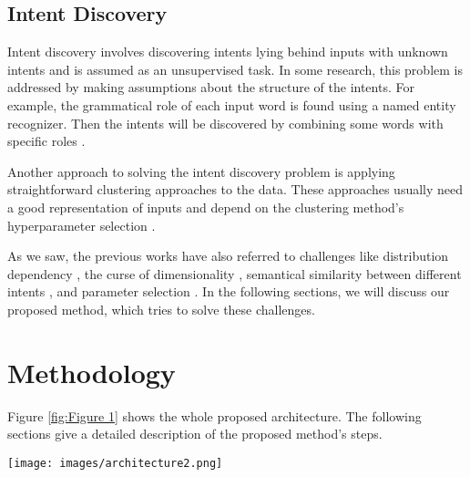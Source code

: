 \documentclass{article}
\begin{document}
\subsection{Intent Discovery}

\noindent Intent discovery involves discovering intents lying behind inputs with unknown intents and is assumed as an unsupervised task. 
In some research, this problem is addressed by making assumptions about the structure of the intents. 
For example, the grammatical role of each input word is found using a named entity recognizer. 
Then the intents will be discovered by combining some words with specific roles \citep{10.1145/3366423.3380268,zeng2021automatic}.

Another approach to solving the intent discovery problem is applying straightforward clustering approaches to the data. 
These approaches usually need a good representation of inputs and depend on the clustering method's hyperparameter selection \citep{padmasundari2018intent,zhang2021discovering}.

As we saw, the previous works have also referred to challenges like distribution dependency \citep{zhan-etal-2021-scope}, the curse of dimensionality \citep{padmasundari2018intent}, 
semantical similarity between different intents \citep{lin-xu-2019-deep}, and parameter selection \citep{zhang2021discovering}. 
In the following sections, we will discuss our proposed method, which tries to solve these challenges.

\section{Methodology}\label{methodology}

\noindent Figure \ref{fig:Figure 1} shows the whole proposed architecture.
The following sections give a detailed description of the proposed method's steps.

\begin{figure*}[ht!]
	\centering
	\texttt{[image: images/architecture2.png]}
	\caption{This figure shows the whole flow of the proposed architecture. 
			In the first step, the fine-tuned BERT encoder gets utterance  and passes its representation  to the VAE. 
			Then, the reconstruction  is generated, and the loss  between  and  is computed. 
			Suppose  is lower than a threshold . 
			In that case,  will be considered in-domain input, 
			and the related representation  is passed to the simple one-layer neural network classifier to predict its label. 
			Otherwise,  will be passed to the K-PCA dimensionality reduction component, 
			and the HDBSCAN clustering algorithm will predict the resulting vector's pseudo label (or cluster).}
	\label{fig:Figure 1}
  \end{figure*}
\end{document}
